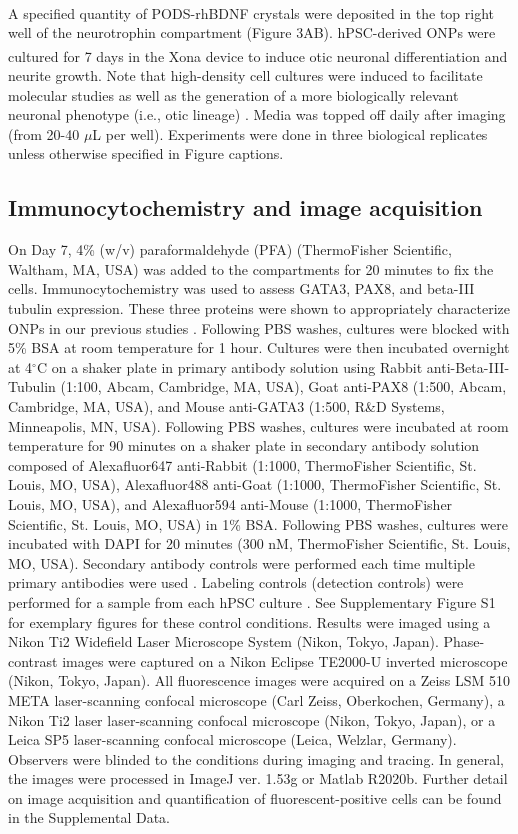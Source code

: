 \documentclass[review]{elsarticle}
\begin{document}
\indent A specified quantity of PODS\textsuperscript{\textregistered}-rhBDNF crystals were deposited in the top right well of the neurotrophin compartment (Figure 3A\textendash B).  hPSC-derived ONPs were cultured for 7 days in the Xona\textsuperscript{\texttrademark} device to induce otic neuronal differentiation and neurite growth. Note that high-density cell cultures were induced to facilitate molecular studies as well as the generation of a more biologically relevant neuronal phenotype (i.e., otic lineage) \cite{Al-Ali2017a}. Media was topped off daily after imaging (from 20-40 $\mu$L per well). Experiments were done in three biological replicates unless otherwise specified in Figure captions.

\subsection{Immunocytochemistry and image acquisition}
On Day 7, 4\% (w/v) paraformaldehyde (PFA) (ThermoFisher Scientific, Waltham, MA, USA) was added to the compartments for 20 minutes to fix the cells. Immunocytochemistry was used to assess GATA3, PAX8, and beta-III tubulin expression. These three proteins were shown to appropriately characterize ONPs in our previous studies \cite{Heuer2021, Chang2020, Matsuoka2017}. Following PBS washes, cultures were blocked with 5\% BSA at room temperature for 1 hour. Cultures were then incubated overnight at 4$^\circ$C on a shaker plate in primary antibody solution using Rabbit anti-Beta-III-Tubulin (1:100, Abcam, Cambridge, MA, USA), Goat anti-PAX8 (1:500, Abcam, Cambridge, MA, USA), and Mouse anti-GATA3 (1:500, R\&D Systems, Minneapolis, MN, USA). Following PBS washes, cultures were incubated at room temperature for 90 minutes on a shaker plate in secondary antibody solution composed of Alexafluor647 anti-Rabbit (1:1000, ThermoFisher Scientific, St. Louis, MO, USA), Alexafluor488 anti-Goat (1:1000, ThermoFisher Scientific, St. Louis, MO, USA), and Alexafluor594 anti-Mouse (1:1000, ThermoFisher Scientific, St. Louis, MO, USA) in 1\% BSA. Following PBS washes, cultures were incubated with DAPI for 20 minutes (300 nM, ThermoFisher Scientific, St. Louis, MO, USA). Secondary antibody controls were performed each time multiple primary antibodies were used \cite{Burry2011}. Labeling controls (detection controls) were performed for a sample from each hPSC culture \cite{Burry2011}. See Supplementary Figure S1 for exemplary figures for these control conditions. Results were imaged using a Nikon Ti2 Widefield Laser Microscope System (Nikon, Tokyo, Japan). Phase-contrast images were captured on a Nikon Eclipse TE2000-U inverted microscope (Nikon, Tokyo, Japan). All fluorescence images were acquired on a Zeiss LSM 510 META laser-scanning confocal microscope (Carl Zeiss, Oberkochen, Germany), a Nikon Ti2 laser laser-scanning confocal microscope (Nikon, Tokyo, Japan), or a Leica SP5 laser-scanning confocal microscope (Leica, Welzlar, Germany). Observers were blinded to the conditions during imaging and tracing. In general, the images were processed in ImageJ ver. 1.53g or Matlab R2020b. Further detail on image acquisition and quantification of fluorescent-positive cells can be found in the Supplemental Data. 
\end{document}
